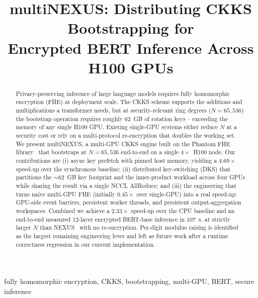 \documentclass[conference]{IEEEtran}
\begin{document}
\title{multiNEXUS: Distributing CKKS Bootstrapping for\\ Encrypted BERT Inference Across H100 GPUs}

\author{
}

\maketitle

\begin{abstract}
Privacy-preserving inference of large language models requires fully
homomorphic encryption (FHE) at deployment scale. The CKKS scheme
supports the additions and multiplications a transformer needs, but at
security-relevant ring degrees ($N{=}65{,}536$) the bootstrap operation
requires roughly $62$~GB of rotation keys -- exceeding the memory of any
single H100 GPU. Existing single-GPU systems either reduce $N$ at a
security cost or rely on a multi-protocol re-encryption that doubles the
working set. We present multiNEXUS, a multi-GPU CKKS engine built on
the Phantom FHE library~\cite{Phantom_FHE} that bootstraps at
$N{=}65{,}536$ end-to-end on a single $4\times$~H100 node. Our
contributions are
(i) async key prefetch with pinned host memory, yielding a $4.69\times$
speed-up over the synchronous baseline;
(ii) distributed key-switching (DKS) that partitions the $\sim 62$~GB
key footprint and the inner-product workload across four GPUs while
sharing the result via a single NCCL AllReduce; and
(iii) the engineering that turns naïve multi-GPU FHE
(initially $0.45\times$ over single-GPU) into a real speed-up:
GPU-side event barriers, persistent worker threads, and persistent
output-aggregation workspaces. Combined we achieve a
$2.33\times$ speed-up over the CPU baseline and an end-to-end measured
12-layer encrypted BERT-base inference in $107$~s, at strictly larger
$N$ than NEXUS~\cite{Zhang2025} with no re-encryption. Per-digit modulus
raising is identified as the largest remaining engineering lever and
left as future work after a runtime correctness regression in our
current implementation.
\end{abstract}

\begin{IEEEkeywords}
fully homomorphic encryption, CKKS, bootstrapping, multi-GPU, BERT, secure inference
\end{IEEEkeywords}
\end{document}
